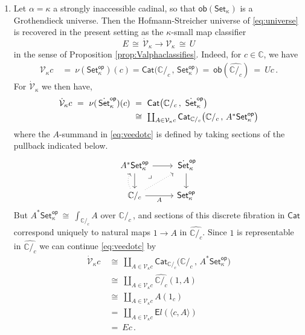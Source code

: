 \documentclass[11pt]{article}
\newcommand{\C}{\ensuremath{\mathbb{C}}}
\newcommand{\Set}{\ensuremath{\mathsf{Set}}}
\newcommand{\Cat}{\ensuremath{\mathsf{Cat}}}
\renewcommand{\to}{\ensuremath{\rightarrow}}
\newcommand{\too}{\ensuremath{\longrightarrow}}
\newcommand{\SSet}{\ensuremath{\,\dot{\Set}}}
\newcommand{\V}{\ensuremath{\mathcal{V}}}
\newcommand{\VV}{\ensuremath{\dot{\mathcal{V}}}}
\newcommand{\pbmark}{\ar[dr, phantom, "\lrcorner" very near start, shift right=.5ex]}	%
\theoremstyle{remark}
\theoremstyle{definition}
\begin{document}
\begin{enumerate}
%
\item Let $\alpha = \kappa$ a strongly inaccessible cadinal, so that $\mathsf{ob}({\Set_\kappa})$ is a Grothendieck universe.  Then the Hofmann-Streicher universe of \eqref{eq:universe} is recovered in the present setting as the $\kappa$-small map classifier
\begin{equation*}
E\, \cong\, \VV_\kappa \too \V_\kappa\, \cong\, U
\end{equation*}
 in the sense of Proposition \ref{prop:Valphaclassifies}.  Indeed, for $c\in\C$, we have 
 \begin{align}
  \V_{\kappa}{c}\ &=\ \nu(\Set^{\mathsf{op}}_\kappa)(c) = \Cat\big( {\C/_c}\,,\, \Set^{\mathsf{op}}_\kappa \big)\  =\ \mathsf{ob}(\widehat{\C/_c})\ =\ U{c} \,.
   \end{align} 
For $\VV_{\kappa}$ we then have,
   \begin{align}\label{eq:veedotc}
   \VV_{\kappa}{c}\ =\ \nu(\SSet^{\mathsf{op}}_\kappa)(c)\ &=\ \Cat\big( {\C/_c}\,,\, \SSet^{\mathsf{op}}_\kappa \big) \notag \\ 
   &\cong\ {\textstyle \coprod_{A\in\V_{\kappa}{c}}\Cat_{{\C/_c}}\big( {\C/_c}\,,\, A^*\Set^{\mathsf{op}}_\kappa \big)}
   \end{align}
   where the $A$-summand in \eqref{eq:veedotc} is defined by taking sections of the  pullback indicated below.
   \begin{equation}\label{eq:pbforindexing}\textstyle
\begin{tikzcd}
	A^*\Set^{\mathsf{op}}_\kappa \ar[d] \ar[r] \pbmark & \SSet^{\mathsf{op}}_\kappa \ar[d]\\  
	\C/_c \ar[r,swap,"A"] \ar[u, bend left, dotted] \ar[ur, dotted] &  \Set^{\mathsf{op}}_\kappa
 \end{tikzcd}
 \end{equation}
 But $A^*\Set^{\mathsf{op}}_\kappa\ \cong\ {\textstyle \int_{\C/_c}\!A}$ over $\C/_c\,$, and sections of this discrete fibration in $\Cat$ correspond uniquely to natural maps $1\to A$ in $\widehat{{\C/_c}}$.  Since $1$  is representable in $\widehat{{\C/_c}}$ we can continue \eqref{eq:veedotc} by
  \begin{align*}
   \VV_{\kappa}{c}\ &\cong\ {\textstyle \coprod_{A\in \V_{\kappa}{c}}\Cat_{{\C/_c}}\big( {\C/_c}\,,\, A^*\Set^{\mathsf{op}}_\kappa \big)}\\
   	&\cong\ {\textstyle \coprod_{A\in \V_{\kappa}{c}} \widehat{{\C/_c}}(1, A)}\\
	&\cong\ {\textstyle \coprod_{A\in \V_{\kappa}{c}} A(1_c) } \\
	& =\ {\textstyle \coprod_{A\in \V_{\kappa}{c}} {\mathsf{E}l}(\langle c, A\rangle)}\\
	& =\  E c\,.
   \end{align*}
 

\end{enumerate}
\end{document}
